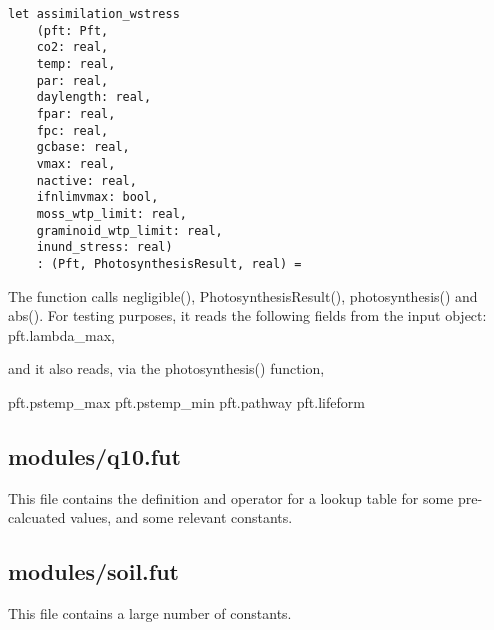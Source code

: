 \begin{verbatim}
let assimilation_wstress
    (pft: Pft,
    co2: real,
    temp: real,
    par: real,
    daylength: real,
    fpar: real,
    fpc: real,
    gcbase: real,
    vmax: real,
    nactive: real,
    ifnlimvmax: bool,
    moss_wtp_limit: real,
    graminoid_wtp_limit: real,
    inund_stress: real)
    : (Pft, PhotosynthesisResult, real) =
\end{verbatim}

The function calls negligible(), PhotosynthesisResult(), photosynthesis() and abs(). For testing purposes, it reads the following fields from the input object: pft.lambda_max,

and it also reads, via the photosynthesis() function,

pft.pstemp_max
pft.pstemp_min
pft.pathway
pft.lifeform

\subsection{modules/q10.fut}
This file contains the definition and operator for a lookup table for some pre-calcuated values, and some relevant constants.

\subsection{modules/soil.fut}
This file contains a large number of constants.
